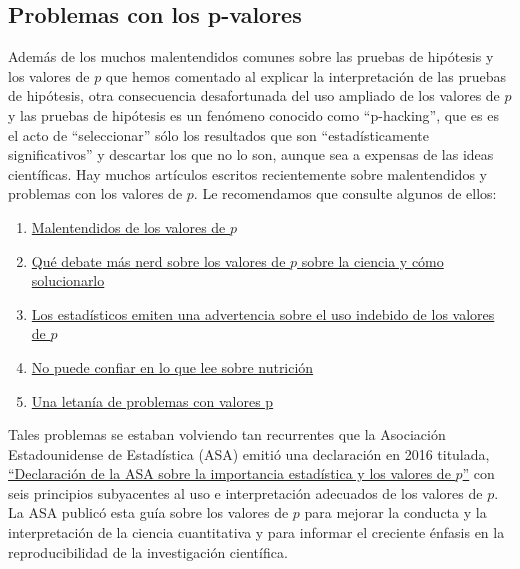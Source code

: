 \documentclass[
]{book}
\providecommand{\tightlist}{%
  \setlength{\itemsep}{0pt}\setlength{\parskip}{0pt}}
\begin{document}
\hypertarget{problemas-con-los-p-valores}{%
\subsection{Problemas con los p-valores}\label{problemas-con-los-p-valores}}

Además de los muchos malentendidos comunes sobre las pruebas de hipótesis y los valores de \(p\) que hemos comentado al explicar la interpretación de las pruebas de hipótesis, otra consecuencia desafortunada del uso ampliado de los valores de \(p\) y las pruebas de hipótesis es un fenómeno conocido como ``p-hacking'', que es es el acto de ``seleccionar'' sólo los resultados que son ``estadísticamente significativos'' y descartar los que no lo son, aunque sea a expensas de las ideas científicas. Hay muchos artículos escritos recientemente sobre malentendidos y problemas con los valores de \(p\). Le recomendamos que consulte algunos de ellos:

\begin{enumerate}
\def\labelenumi{\arabic{enumi}.}
\tightlist
\item
  \href{https://en.wikipedia.org/wiki/Misunderstandings_of_p-values}{Malentendidos de los valores de \(p\)}
\item
  \href{https://www.vox.com/science-and-health/2017/7/31/16021654/p-\%20valores-significación-estadística-redefinir-0005}{Qué debate más nerd sobre los valores de \(p\) sobre la ciencia y cómo solucionarlo}
\item
  \href{https://www.nature.com/news/statisticians-issue-warning-over-misuse-of-p-values-1.19503}{Los estadísticos emiten una advertencia sobre el uso indebido de los valores de \(p\)}
\item
  \href{https://fivethirtyeight.com/features/you-cant-trust-what-you-read-about-nutrition/}{No puede confiar en lo que lee sobre nutrición}
\item
  \href{http://www.fharrell.com/post/pval-litany/}{Una letanía de problemas con valores p}
\end{enumerate}

Tales problemas se estaban volviendo tan recurrentes que la Asociación Estadounidense de Estadística (ASA) emitió una declaración en 2016 titulada, \href{https://www.amstat.org/asa/files/pdfs/P-ValueStatement.pdf}{``Declaración de la ASA sobre la importancia estadística y los valores de \(p\)''} con seis principios subyacentes al uso e interpretación adecuados de los valores de \(p\). La ASA publicó esta guía sobre los valores de \(p\) para mejorar la conducta y la interpretación de la ciencia cuantitativa y para informar el creciente énfasis en la reproducibilidad de la investigación científica.
\end{document}
